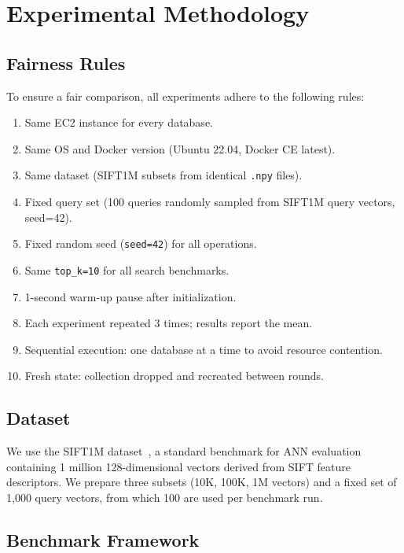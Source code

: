 \documentclass[12pt,a4paper]{article}
\begin{document}
\section{Experimental Methodology}

\subsection{Fairness Rules}

To ensure a fair comparison, all experiments adhere to the following rules:
\begin{enumerate}[nosep]
    \item Same EC2 instance for every database.
    \item Same OS and Docker version (Ubuntu 22.04, Docker CE latest).
    \item Same dataset (SIFT1M subsets from identical \texttt{.npy} files).
    \item Fixed query set (100 queries randomly sampled from SIFT1M query vectors, seed=42).
    \item Fixed random seed (\texttt{seed=42}) for all operations.
    \item Same \texttt{top\_k=10} for all search benchmarks.
    \item 1-second warm-up pause after initialization.
    \item Each experiment repeated 3 times; results report the mean.
    \item Sequential execution: one database at a time to avoid resource contention.
    \item Fresh state: collection dropped and recreated between rounds.
\end{enumerate}

\subsection{Dataset}

We use the SIFT1M dataset~\cite{jegou2011sift}, a standard benchmark for ANN evaluation containing 1 million 128-dimensional vectors derived from SIFT feature descriptors. We prepare three subsets (10K, 100K, 1M vectors) and a fixed set of 1,000 query vectors, from which 100 are used per benchmark run.

\subsection{Benchmark Framework}
\end{document}
